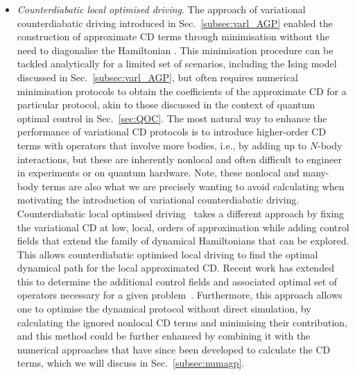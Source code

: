 \begin{itemize}
\item {\it Counterdiabatic local optimised driving}. The approach of variational counterdiabatic driving introduced in Sec.~\ref{subsec:varl_AGP} enabled the construction of approximate CD terms through minimisation without the need to diagonalise the Hamiltonian \cite{sels2017minimizing,kolodrubetz2017geometry}. This minimisation procedure can be tackled analytically for a limited set of scenarios, including the Ising model discussed in Sec.~\ref{subsec:varl_AGP}, but often requires numerical minimisation protocols to obtain the coefficients of the approximate CD for a particular protocol, akin to those discussed in the context of quantum optimal control in Sec.~\ref{sec:QOC}. The most natural way to enhance the performance of variational CD protocols is to introduce higher-order CD terms with operators that involve more bodies, i.e., by adding up to $N$-body interactions, but these are inherently nonlocal and often difficult to engineer in experiments or on quantum hardware. Note, these nonlocal and many-body terms are also what we are precisely wanting to avoid calculating when motivating the introduction of variational counterdiabatic driving. Counterdiabatic local optimised driving~\cite{COLD_PRXQ} takes a different approach by fixing the variational CD at low, local, orders of approximation while adding control fields that extend the family of dynamical Hamiltonians that can be explored. This allows  counterdiabatic optimised local driving to find the optimal dynamical path for the local approximated CD. Recent work has extended this to determine the additional control fields and associated optimal set of operators necessary for a given problem~\cite{morawetz2024efficient}. Furthermore, this approach allows one to optimise the dynamical protocol without direct simulation, by calculating the ignored nonlocal CD terms and minimising their contribution, and this method could be further enhanced by combining it with the numerical approaches that have since been developed to calculate the CD terms, which we will discuss in Sec.~\ref{subsec:numagp}.


\end{itemize}
